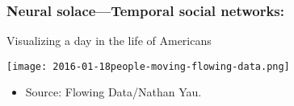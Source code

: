 \begin{frame}
  \frametitle{Neural solace---Temporal social networks:}

  \begin{block}{
      {Visualizing a day in the life of Americans}
    }
    
    \begin{center}
    \texttt{[image: 2016-01-18people-moving-flowing-data.png]}
    \end{center}

    \begin{itemize}
    \item   
      Source: Flowing Data/Nathan Yau.
    \end{itemize}
  \end{block}

  
\end{frame}
